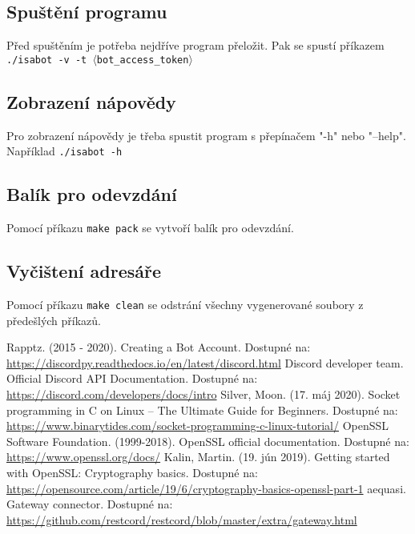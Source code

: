 \documentclass[a4paper,11pt]{article}
\begin{document}
\subsection{Spuštění programu}
Před spuštěním je potřeba nejdříve program přeložit. Pak se spustí příkazem \texttt{./isabot -v -t $\langle$bot\_access\_token$\rangle$}

\subsection{Zobrazení nápovědy}
Pro zobrazení nápovědy je třeba spustit program s přepínačem "-h" nebo "--help". Například \texttt{./isabot -h}

\subsection{Balík pro odevzdání}
Pomocí příkazu \texttt{make pack} se vytvoří balík pro odevzdání.

\subsection{Vyčištení adresáře}
Pomocí příkazu \texttt{make clean} se odstrání všechny vygenerované soubory z předešlých příkazů.

\newpage

\begin{thebibliography}{6}
	 Rapptz. (2015 - 2020). Creating a Bot Account. Dostupné na: \\ \url{https://discordpy.readthedocs.io/en/latest/discord.html}
	 Discord developer team. Official Discord API Documentation. Dostupné na: \\ \url{https://discord.com/developers/docs/intro}
	 Silver, Moon. (17. máj 2020). Socket programming in C on Linux – The Ultimate Guide for Beginners. Dostupné na: \\ \url{https://www.binarytides.com/socket-programming-c-linux-tutorial/}
	 OpenSSL Software Foundation. (1999-2018). OpenSSL official documentation. Dostupné na: \\ \url{https://www.openssl.org/docs/}
	 Kalin, Martin. (19. jún 2019). Getting started with OpenSSL: Cryptography basics. Dostupné na: \\ \url{https://opensource.com/article/19/6/cryptography-basics-openssl-part-1}
	 aequasi. Gateway connector. Dostupné na: \\ \url{https://github.com/restcord/restcord/blob/master/extra/gateway.html}
\end{thebibliography}
\end{document}

